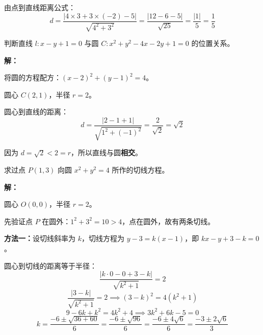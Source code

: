 \documentclass[12pt, a4paper]{ctexart}
\begin{document}
由点到直线距离公式：
\[
d = \frac{|4 \times 3 + 3 \times (-2) - 5|}{\sqrt{4^2 + 3^2}} = \frac{|12 - 6 - 5|}{\sqrt{25}} = \frac{|1|}{5} = \boxed{\dfrac{1}{5}}
\]

\bigskip

\begin{examplebox}[【例题5】直线与圆的位置关系]
判断直线 $l: x - y + 1 = 0$ 与圆 $C: x^2 + y^2 - 4x - 2y + 1 = 0$ 的位置关系。
\end{examplebox}

\textbf{解：}

将圆的方程配方：$(x - 2)^2 + (y - 1)^2 = 4$。

圆心 $C(2, 1)$，半径 $r = 2$。

圆心到直线的距离：
\[
d = \frac{|2 - 1 + 1|}{\sqrt{1^2 + (-1)^2}} = \frac{2}{\sqrt{2}} = \sqrt{2}
\]

因为 $d = \sqrt{2} < 2 = r$，所以直线与圆\textbf{相交}。

\begin{center}
\end{center}

\bigskip

\begin{examplebox}[【例题6】圆的切线方程]
求过点 $P(1, 3)$ 向圆 $x^2 + y^2 = 4$ 所作的切线方程。
\end{examplebox}

\textbf{解：}

圆心 $O(0, 0)$，半径 $r = 2$。

先验证点 $P$ 在圆外：$1^2 + 3^2 = 10 > 4$，点在圆外，故有两条切线。

\textbf{方法一：}设切线斜率为 $k$，切线方程为 $y - 3 = k(x - 1)$，即 $kx - y + 3 - k = 0$。

圆心到切线的距离等于半径：
\[
\frac{|k \cdot 0 - 0 + 3 - k|}{\sqrt{k^2 + 1}} = 2
\]
\[
\frac{|3 - k|}{\sqrt{k^2 + 1}} = 2 \implies (3 - k)^2 = 4(k^2 + 1)
\]
\[
9 - 6k + k^2 = 4k^2 + 4 \implies 3k^2 + 6k - 5 = 0
\]
\[
k = \frac{-6 \pm \sqrt{36 + 60}}{6} = \frac{-6 \pm \sqrt{96}}{6} = \frac{-6 \pm 4\sqrt{6}}{6} = \frac{-3 \pm 2\sqrt{6}}{3}
\]
\end{document}
